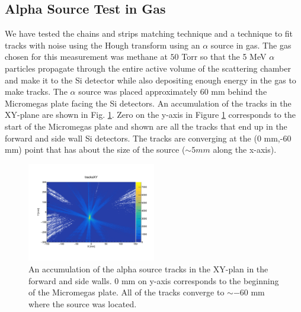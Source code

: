 \documentclass[final,number,sort&compress,5p,times,twocolumn]{elsarticle}
\begin{document}
 \subsection{Alpha Source Test in Gas}
 
We have tested the chains and strips matching technique and a technique to fit tracks with noise using the Hough transform using an $\alpha$ source in gas. The gas chosen for this measurement was methane at $50$ Torr so that the 5 MeV $\alpha$ particles propagate through the entire active volume of the scattering chamber and make it to the Si detector while also depositing enough energy in the gas to make tracks. The $\alpha$ source was placed approximately 60 mm behind the Micromegas plate facing the Si detectors. An accumulation of the tracks in the XY-plane are shown in Fig. \ref{fig:TexATAlphaTracksXY}. Zero on the y-axis in Figure \ref{fig:TexATAlphaTracksXY} corresponds to the start of the Micromegas plate and shown are all the tracks that end up in the forward and side wall Si detectors. The tracks are converging at the (0 mm,-60 mm) point that has about the size of the source ($\sim 5 mm$ along the x-axis).
 
\begin{figure}[hbt!]
	\centering
	\includegraphics[width=0.5\textwidth]{figures/TexATAlphaSourceTrackingXY}
    \caption{An accumulation of the alpha source tracks in the XY-plan in the forward and side walls. 0 mm on y-axis corresponds to the beginning of the Micromegas plate. All of the tracks converge to $\sim -60$ mm where the source was located.}
    \label{fig:TexATAlphaTracksXY}
\end{figure}
\end{document}
